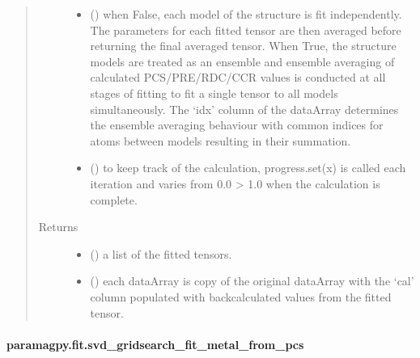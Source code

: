 \documentclass[a4paper,10pt,english,openany,oneside]{sphinxmanual}
\begin{document}
\begin{fulllineitems}
\begin{quote}
\begin{description}
\begin{itemize}
\item {} 
\sphinxAtStartPar
{} (\sphinxstyleliteralemphasis{\sphinxupquote{, }}) \textendash{} when False, each model of the structure is fit independently.
The parameters for each fitted tensor are then averaged before
returning the final averaged tensor.
When True, the structure models are treated as an ensemble and
ensemble averaging of calculated PCS/PRE/RDC/CCR values is
conducted at all stages of fitting to fit a single tensor to all
models simultaneously. The ‘idx’ column of the dataArray
determines the ensemble averaging behaviour with common indices
for atoms between models resulting in their summation.

\item {} 
\sphinxAtStartPar
{} (\sphinxstyleliteralemphasis{\sphinxupquote{, }}) \textendash{} to keep track of the calculation, progress.set(x) is called each
iteration and varies from 0.0 \sphinxhyphen{}\textgreater{} 1.0 when the calculation is complete.

\end{itemize}

\item[{Returns}] \leavevmode
\sphinxAtStartPar
\begin{itemize}
\item {} 
\sphinxAtStartPar
{} () \textendash{} a list of the fitted tensors.

\item {} 
\sphinxAtStartPar
{} () \textendash{} each dataArray is copy of the original dataArray with
the ‘cal’ column populated with back\sphinxhyphen{}calculated values from the
fitted tensor.

\end{itemize}


\end{description}\end{quote}

\end{fulllineitems}



\paragraph{paramagpy.fit.svd\_gridsearch\_fit\_metal\_from\_pcs}
\label{\detokenize{reference/generated/paramagpy.fit.svd_gridsearch_fit_metal_from_pcs:paramagpy-fit-svd-gridsearch-fit-metal-from-pcs}}\label{\detokenize{reference/generated/paramagpy.fit.svd_gridsearch_fit_metal_from_pcs::doc}}
\end{document}
